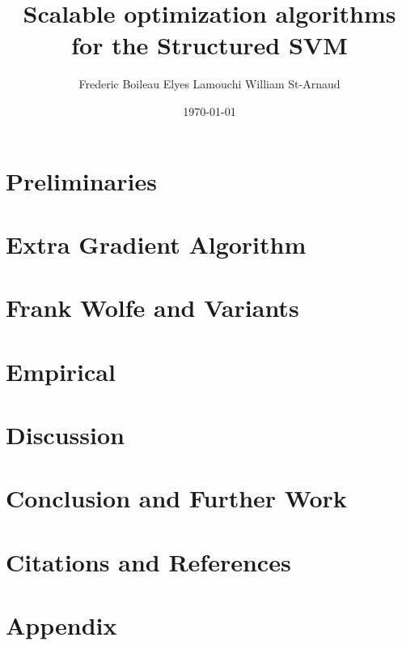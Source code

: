 

\usepackage[
  backend=biber,
  style=numeric,
  citestyle=numeric
]{biblatex}

\title{Scalable optimization algorithms for the Structured SVM}
\date{\today}
\author{Frederic Boileau Elyes Lamouchi William St-Arnaud}

\maketitle

\clearpage
\section{Preliminaries}


\clearpage
\section{Extra Gradient Algorithm}


\clearpage
\section{Frank Wolfe and Variants}


\clearpage
\section{Empirical}


\clearpage
\section{Discussion}


\clearpage
\section{Conclusion and Further Work}


\clearpage
\section{Citations and References}
\printbibliography

\clearpage
\section{Appendix}


